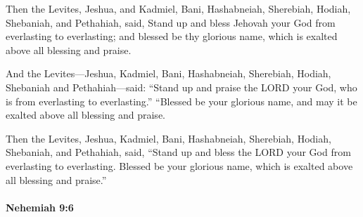 			\begin{versebox}
					\item[BHS] 
					\item[LXX] 
					\item[ASV] Then the Levites, Jeshua, and Kadmiel, Bani, Hashabneiah, Sherebiah, Hodiah, Shebaniah, and Pethahiah, said, Stand up and bless Jehovah your God from everlasting to everlasting; and blessed be thy glorious name, which is exalted above all blessing and praise.
					\item[NIV] And the Levites—Jeshua, Kadmiel, Bani, Hashabneiah, Sherebiah, Hodiah, Shebaniah and Pethahiah—said: “Stand up and praise the LORD your God, who is from everlasting to everlasting.” “Blessed be your glorious name, and may it be exalted above all blessing and praise.
					\item[NRSV] Then the Levites, Jeshua, Kadmiel, Bani, Hashabneiah, Sherebiah, Hodiah, Shebaniah, and Pethahiah, said, “Stand up and bless the LORD your God from everlasting to everlasting. Blessed be your glorious name, which is exalted above all blessing and praise.”
			\end{versebox}

		\paragraph{Nehemiah 9:6} %
			\label{NEHEMIAH-9-6}

